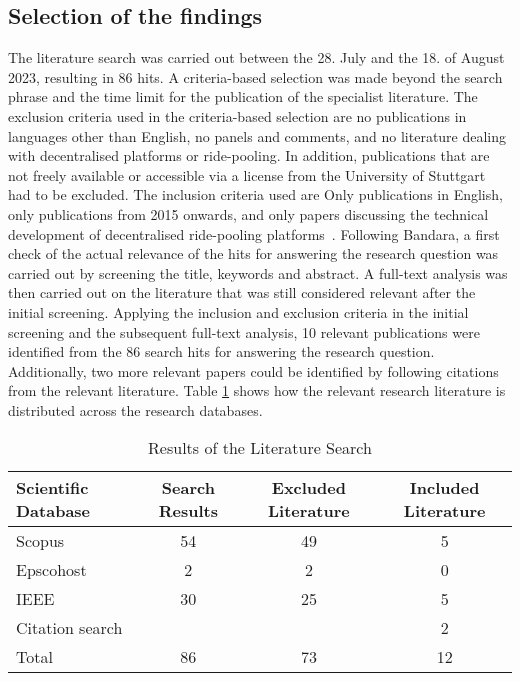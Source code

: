 \subsection{Selection of the findings}
The literature search was carried out between the 28. July and the 18. of August 2023, resulting in 86 hits. A criteria-based selection was made beyond the search phrase and the time limit for the publication of the specialist literature. The exclusion criteria used in the criteria-based selection are no publications in languages other than English, no panels and comments, and no literature dealing with decentralised platforms or ride-pooling. In addition, publications that are not freely available or accessible via a license from the University of Stuttgart had to be excluded. The inclusion criteria used are Only publications in English, only publications from 2015 onwards, and only papers discussing the technical development of decentralised ride-pooling platforms~\cite{Bandara.2015}.
Following Bandara, a first check of the actual relevance of the hits for answering the research question was carried out by screening the title, keywords and abstract. A full-text analysis was then carried out on the literature that was still considered relevant after the initial screening. Applying the inclusion and exclusion criteria in the initial screening and the subsequent full-text analysis, 10 relevant publications were identified from the 86 search hits for answering the research question. Additionally, two more relevant papers could be identified by following citations from the relevant literature.  Table \ref{tab:litSearchResults} shows how the relevant research literature is distributed across the research databases. 


\begin{table}[h]
\centering
\caption{Results of the Literature Search}
\label{tab:litSearchResults}
\begin{tabular}{|l|c|c|c|}
\hline
Scientific Database & Search Results & Excluded Literature & Included Literature \\ \hline
Scopus & 54 & 49 & 5 \\ \hline
Epscohost & 2 & 2 & 0 \\ \hline
IEEE & 30 & 25 & 5 \\ \hline
Citation search &  &  & 2 \\ \hline \hline
Total & 86 & 73 & 12 \\ \hline
\end{tabular}
\end{table}

